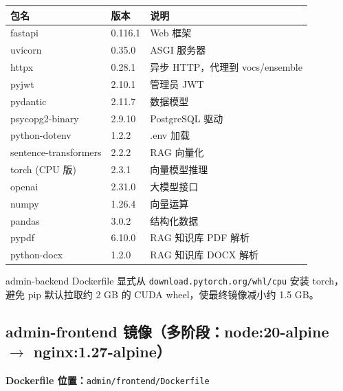 \documentclass[UTF8,a4paper,11pt]{ctexart}
\begin{document}
\begin{longtable}{L{3.8cm} L{2.0cm} L{7.2cm}}
\toprule
\textbf{包名} & \textbf{版本} & \textbf{说明} \\
\midrule
\endhead
fastapi                   & 0.116.1 & Web 框架 \\
uvicorn                   & 0.35.0  & ASGI 服务器 \\
httpx                     & 0.28.1  & 异步 HTTP，代理到 vocs/ensemble \\
pyjwt                     & 2.10.1  & 管理员 JWT \\
pydantic                  & 2.11.7  & 数据模型 \\
psycopg2-binary           & 2.9.10  & PostgreSQL 驱动 \\
python-dotenv             & 1.2.2   & .env 加载 \\
sentence-transformers     & 2.2.2   & RAG 向量化 \\
torch (CPU 版)            & 2.3.1   & 向量模型推理 \\
openai                    & 2.31.0  & 大模型接口 \\
numpy                     & 1.26.4  & 向量运算 \\
pandas                    & 3.0.2   & 结构化数据 \\
pypdf                     & 6.10.0  & RAG 知识库 PDF 解析 \\
python-docx               & 1.2.0   & RAG 知识库 DOCX 解析 \\
\bottomrule
\end{longtable}

\begin{warnbox}[体积优化]
admin-backend Dockerfile 显式从 \texttt{download.pytorch.org/whl/cpu} 安装 torch，
避免 pip 默认拉取约 2 GB 的 CUDA wheel，使最终镜像减小约 1.5 GB。
\end{warnbox}

\subsection{admin-frontend 镜像（多阶段：node:20-alpine $\rightarrow$ nginx:1.27-alpine）}

\textbf{Dockerfile 位置：}\texttt{admin/frontend/Dockerfile}
\end{document}
